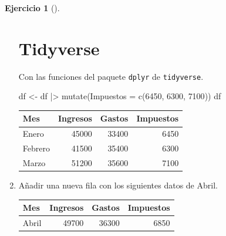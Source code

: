 \documentclass[
  a4paper,
]{scrreport}
\newenvironment{Shaded}{\begin{snugshade}}{\end{snugshade}}
\newcommand{\AttributeTok}[1]{\textcolor[rgb]{0.40,0.45,0.13}{#1}}
\newcommand{\DecValTok}[1]{\textcolor[rgb]{0.68,0.00,0.00}{#1}}
\newcommand{\FunctionTok}[1]{\textcolor[rgb]{0.28,0.35,0.67}{#1}}
\newcommand{\NormalTok}[1]{\textcolor[rgb]{0.00,0.23,0.31}{#1}}
\newcommand{\OtherTok}[1]{\textcolor[rgb]{0.00,0.23,0.31}{#1}}
\newcommand{\SpecialCharTok}[1]{\textcolor[rgb]{0.37,0.37,0.37}{#1}}
\theoremstyle{definition}
\newtheorem{exercise}{Ejercicio}[chapter]
\theoremstyle{remark}
\begin{document}
\begin{exercise}[]
\begin{enumerate}
\begin{tcolorbox}
  \section{Tidyverse}

  Con las funciones del paquete \texttt{dplyr} de \texttt{tidyverse}.

\begin{Shaded}
\begin{Highlighting}[]
\NormalTok{df }\OtherTok{\textless{}{-}}\NormalTok{ df }\SpecialCharTok{|\textgreater{}} \FunctionTok{mutate}\NormalTok{(}\AttributeTok{Impuestos =} \FunctionTok{c}\NormalTok{(}\DecValTok{6450}\NormalTok{, }\DecValTok{6300}\NormalTok{, }\DecValTok{7100}\NormalTok{))}
\NormalTok{df}
\end{Highlighting}
\end{Shaded}

  \begin{longtable}[]{@{}lrrr@{}}
  \toprule\noalign{}
  Mes & Ingresos & Gastos & Impuestos \\
  \midrule\noalign{}
  \endhead
  \bottomrule\noalign{}
  \endlastfoot
  Enero & 45000 & 33400 & 6450 \\
  Febrero & 41500 & 35400 & 6300 \\
  Marzo & 51200 & 35600 & 7100 \\
  \end{longtable}

  \end{tcolorbox}
\item
  Añadir una nueva fila con los siguientes datos de Abril.

  \begin{longtable}[]{@{}lrrr@{}}
  \toprule\noalign{}
  Mes & Ingresos & Gastos & Impuestos \\
  \midrule\noalign{}
  \endhead
  \bottomrule\noalign{}
  \endlastfoot
  Abril & 49700 & 36300 & 6850 \\
  \end{longtable}

  \begin{tcolorbox}[enhanced jigsaw, colframe=quarto-callout-tip-color-frame, toprule=.15mm, bottomtitle=1mm, breakable, opacitybacktitle=0.6, toptitle=1mm, colback=white, bottomrule=.15mm, title=\textcolor{quarto-callout-tip-color}{\faLightbulb}\hspace{0.5em}{Solución}, arc=.35mm, left=2mm, titlerule=0mm, rightrule=.15mm, coltitle=black, leftrule=.75mm, opacityback=0, colbacktitle=quarto-callout-tip-color!10!white]


\end{tcolorbox}
\end{enumerate}
\end{exercise}
\end{document}
